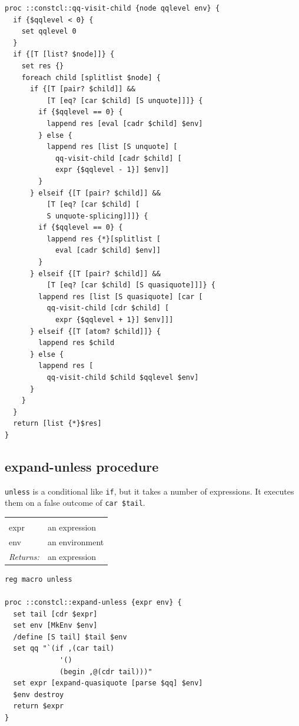 \documentclass[a5paper,draft]{memoir}
\begin{document}
\begin{lstlisting}
proc ::constcl::qq-visit-child {node qqlevel env} {
  if {$qqlevel < 0} {
    set qqlevel 0
  }
  if {[T [list? $node]]} {
    set res {}
    foreach child [splitlist $node] {
      if {[T [pair? $child]] &&
          [T [eq? [car $child] [S unquote]]]} {
        if {$qqlevel == 0} {
          lappend res [eval [cadr $child] $env]
        } else {
          lappend res [list [S unquote] [
            qq-visit-child [cadr $child] [
            expr {$qqlevel - 1}] $env]]
        }
      } elseif {[T [pair? $child]] &&
          [T [eq? [car $child] [
          S unquote-splicing]]]} {
        if {$qqlevel == 0} {
          lappend res {*}[splitlist [
            eval [cadr $child] $env]]
        }
      } elseif {[T [pair? $child]] &&
          [T [eq? [car $child] [S quasiquote]]]} {
        lappend res [list [S quasiquote] [car [
          qq-visit-child [cdr $child] [
            expr {$qqlevel + 1}] $env]]]
      } elseif {[T [atom? $child]]} {
        lappend res $child
      } else {
        lappend res [
          qq-visit-child $child $qqlevel $env]
      }
    }
  }
  return [list {*}$res]
}
\end{lstlisting}

\subsection{expand-unless procedure}
\label{expandunless-procedure}

\texttt{unless} is a conditional like \texttt{if}, but it takes a number of expressions. It executes them on a false outcome of \texttt{car \$tail}.

\noindent\begin{tabular}{ |p{1.9cm} p{6.5cm}| }
\hline
\rowcolor[HTML]{CCCCCC} \multicolumn{2}{|l|}{\textbf{expand-unless (internal)}} \\
expr & an expression \\
env & an environment \\
\textit{Returns:} & an expression \\
\hline
\end{tabular}

\begin{lstlisting}
reg macro unless

proc ::constcl::expand-unless {expr env} {
  set tail [cdr $expr]
  set env [MkEnv $env]
  /define [S tail] $tail $env
  set qq "`(if ,(car tail)
             '()
             (begin ,@(cdr tail)))"
  set expr [expand-quasiquote [parse $qq] $env]
  $env destroy
  return $expr
}
\end{lstlisting}
\end{document}
